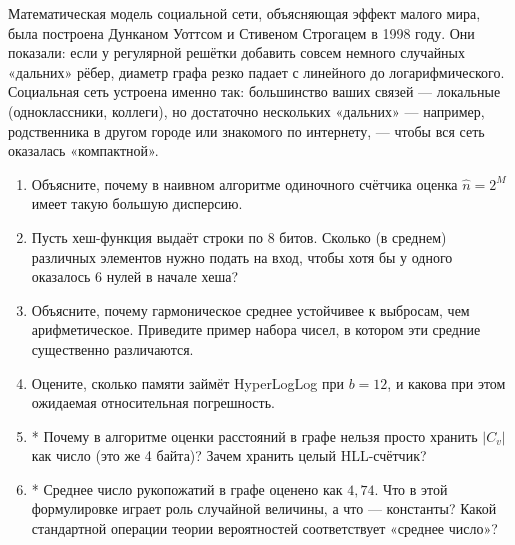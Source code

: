 \begin{interestbox}[title={Это интересно: модель «малого мира» Уоттса--Строгаца}]
Математическая модель социальной сети, объясняющая эффект малого мира, была построена Дунканом Уоттсом и Стивеном Строгацем в 1998 году. Они показали: если у регулярной решётки добавить совсем немного случайных «дальних» рёбер, диаметр графа резко падает с линейного до логарифмического. Социальная сеть устроена именно так: большинство ваших связей --- локальные (одноклассники, коллеги), но достаточно нескольких «дальних» --- например, родственника в другом городе или знакомого по интернету, --- чтобы вся сеть оказалась «компактной».
\end{interestbox}

\begin{tasksbox}
\begin{enumerate}
  \item Объясните, почему в наивном алгоритме одиночного счётчика оценка $\widehat{n} = 2^M$ имеет такую большую дисперсию.
  \item Пусть хеш-функция выдаёт строки по 8 битов. Сколько (в среднем) различных элементов нужно подать на вход, чтобы хотя бы у одного оказалось 6 нулей в начале хеша?
  \item Объясните, почему гармоническое среднее устойчивее к выбросам, чем арифметическое. Приведите пример набора чисел, в котором эти средние существенно различаются.
  \item Оцените, сколько памяти займёт HyperLogLog при $b = 12$, и какова при этом ожидаемая относительная погрешность.
  \item* Почему в алгоритме оценки расстояний в графе нельзя просто хранить $|C_v|$ как число (это же 4 байта)? Зачем хранить целый HLL-счётчик?
  \item* Среднее число рукопожатий в графе оценено как $4{,}74$. Что в этой формулировке играет роль случайной величины, а что --- константы? Какой стандартной операции теории вероятностей соответствует «среднее число»?
\end{enumerate}
\end{tasksbox}
